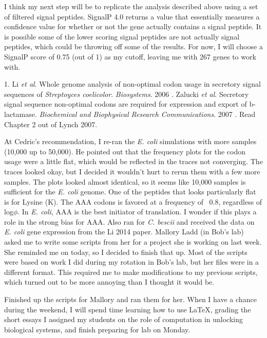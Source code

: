 \documentclass[11pt]{labbook}
\begin{document}
I think my next step will be to replicate the analysis described above using a set of filtered signal peptides. SignalP 4.0 returns a value that essentially measures a confidence value for whether or not the gene actually contains a signal peptide. It is possible some of the lower scoring signal peptides are not actually signal peptides, which could be throwing off some of the results. For now, I will choose a SignalP score of 0.75 (out of 1) as my cutoff, leaving me with 267 genes to work with. 


1. Li \textit{et al}.
Whole genome analysis of non-optimal codon usage in secretory signal sequences of \textit{Streptoyces coelicolor}. \textit{Biosystems}. 2006
. Zalucki \textit{et al}. Secretory signal sequence non-optimal codons are required for expression and export of b-lactamase. \textit{Biochemical and Biophysical Research Communications}. 2007
. Read Chapter 2 out of Lynch 2007.
\let\cleardoublepage\clearpage

At Cedric's recommendation, I re-ran the \textit{E. coli} simulations with more samples (10,000 up to 50,000). He pointed out that the frequency plots for the codon usage were a little flat, which would be reflected in the traces not converging. The traces looked okay, but I decided it wouldn't hurt to rerun them with a few more samples. The plots looked almost identical, so it seems like 10,000 samples is sufficient for the \textit{E. coli} genome. One of the peptides that looks particularly flat is for Lysine (K). The AAA codons is favored at a frequency of ~0.8, regardless of log$\phi$. In \textit{E. coli}, AAA is the best initiator of translation. I wonder if this plays a role in the strong bias for AAA.
\newline
Also ran for \textit{C. bescii} and received the data on \textit{E. coli} gene expression from the Li 2014 paper.
\newline
Mallory Ladd (in Bob's lab) asked me to write some scripts from her for a project she is working on last week. She reminded me on today, so I decided to finish that up. Most of the scripts were based on work I did during my rotation in Bob's lab, but her files were in a different format. This required me to make modifications to my previous scripts, which turned out to be more annoying than I thought it would be.

Finished up the scripts for Mallory and ran them for her. When I have a chance during the weekend, I will spend time learning how to use LaTeX, grading the short essays I assigned my students on the role of computation in unlocking biological systems, and finish preparing for lab on Monday.
\newline
\end{document}
